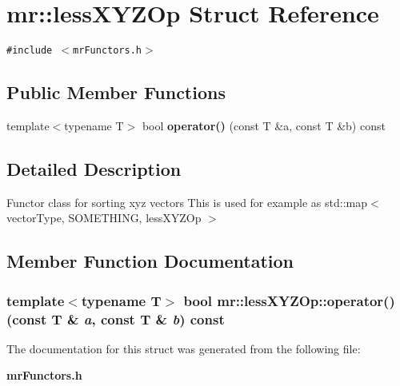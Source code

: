 \section{mr::less\-XYZOp Struct Reference}
\label{structmr_1_1lessXYZOp}
{\tt \#include $<$mr\-Functors.h$>$}

\subsection*{Public Member Functions}
\begin{CompactItemize}
\item 
template$<$typename T$>$ bool {\bf operator()} (const T \&a, const T \&b) const 
\end{CompactItemize}


\subsection{Detailed Description}
Functor class for sorting xyz vectors This is used for example as std::map$<$ vector\-Type, SOMETHING, less\-XYZOp $>$ 



\subsection{Member Function Documentation}
\subsubsection{\setlength{\rightskip}{0pt plus 5cm}template$<$typename T$>$ bool mr::less\-XYZOp::operator() (const T \& {\em a}, const T \& {\em b}) const\hspace{0.3cm}{\tt  [inline]}}\label{structmr_1_1lessXYZOp_a0}




The documentation for this struct was generated from the following file:\begin{CompactItemize}
\item 
{\bf mr\-Functors.h}\end{CompactItemize}
